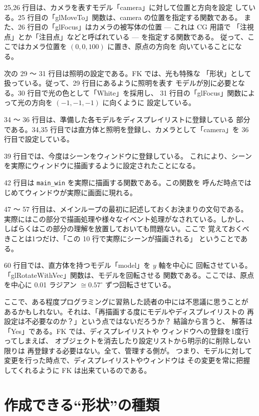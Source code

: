 25,26 行目は、カメラを表すモデル「camera」に対して位置と方向を設定
している。25 行目の「glMoveTo」関数は、camera の位置を指定する関数である。
また、26 行目の「glFocus」はカメラの被写体の位置 --- これは CG 用語で
「注視点」とか「注目点」などと呼ばれている --- を指定する関数である。
従って、ここではカメラ位置を \((0, 0, 100)\) に置き、原点の方向を
向いていることになる。

次の 29 〜 31 行目は照明の設定である。FK では、光も特殊な
「形状」として扱っている。従って、29 行目にあるように照明を表す
モデルが別に必要となる。30 行目で光の色として「White」を採用し、
31 行目の「glFocus」関数によって光の方向を \((-1, -1, -1)\) に向くように
設定している。

34 〜 36 行目は、準備した各モデルをディスプレイリストに登録している
部分である。34,35 行目では直方体と照明を登録し、カメラとして「camera」を
36 行目で設定している。

39 行目では、今度はシーンをウィンドウに登録している。
これにより、シーンを実際にウィンドウに描画するように設定されたことになる。

42 行目は \verb+main_win+ を実際に描画する関数である。この関数を
呼んだ時点ではじめてウィンドウが実際に画面に現れる。

47 〜 57 行目は、メインループの最初に記述しておくお決まりの文句である。
実際にはこの部分で描画処理や様々なイベント処理がなされている。しかし、
しばらくはこの部分の理解を放置しておいても問題ない。ここで
覚えておくべきことは1つだけ、「この 10 行で実際にシーンが描画される」
ということである。

60 行目では、直方体を持つモデル「model」を \(y\) 軸を中心に
回転させている。「glRotateWithVec」関数は、モデルを回転させる
関数である。ここでは、原点を中心に 0.01 ラジアン \(\cong 0.57^\circ\)
ずつ回転させている。

ここで、ある程度プログラミングに習熟した読者の中には不思議に思うことが
あるかもしれない。それは、「再描画する度にモデルやディスプレイリストの
再設定は不必要なのか？」という点ではないだろうか？ 結論から言うと、
解答は「Yes」である。FK では、ディスプレイリストや
ウィンドウへの登録を1度行ってしまえば、
オブジェクトを消去したり設定リストから明示的に削除しない限りは
再登録する必要はない。全て、管理する側が。
つまり、モデルに対して変更を行った時点で、ディスプレイリストやウィンドウは
その変更を常に把握してくれるように FK は出来ているのである。

\section{作成できる``形状''の種類}

